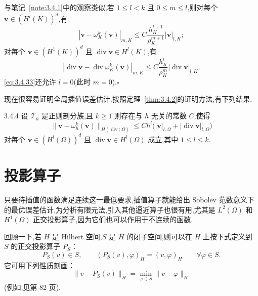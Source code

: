 \begin{note}
与笔记~\ref{note:3.4.1}中的观察类似,若 \(1\le l<k\) 且 \(0\le m\le l\),则对每个 \(\boldsymbol{v}\in(H^l(K))^d\),有
\begin{equation}\label{eq:3.4.32}
  |\boldsymbol{v}-\omega_K^k(\boldsymbol{v})|_{m,K}
   \le C\frac{h_K^{l+1}}{\rho_K^{m+1}}|\boldsymbol{v}|_{l,K};
\end{equation}
对每个 \(\boldsymbol{v}\in(H^1(K))^d\) 且 \(\operatorname{div}\boldsymbol{v}\in H^l(K)\),有
\begin{equation}\label{eq:3.4.33}
  |\operatorname{div}\boldsymbol{v}-\operatorname{div}\omega_K^k(\boldsymbol{v})|_{m,K}
   \le C\frac{h_K^l}{\rho_K^m}|\operatorname{div}\boldsymbol{v}|_{l,K}.
\end{equation}
\eqref{eq:3.4.33}还允许 \(l=0\)(此时 \(m=0\)).\hfill\(\square\)
\end{note}

现在很容易证明全局插值误差估计.按照定理~\ref{thm:3.4.2}的证明方法,有下列结果.

\begin{theorem}[]{3.4.4}
设 \(\mathcal T_h\) 是正则剖分族,且 \(k\ge1\).则存在与 \(h\) 无关的常数 \(C\),使得
\begin{equation}\label{eq:3.4.34}
  \|\boldsymbol{v}-\omega_h^k(\boldsymbol{v})\|_{H(\operatorname{div};\Omega)}
  \le Ch^l\bigl(|\boldsymbol{v}|_{l,\Omega}+|\operatorname{div}\boldsymbol{v}|_{l,\Omega}\bigr)
\end{equation}
对每个 \(\boldsymbol{v}\in(H^l(\Omega))^d\) 且 \(\operatorname{div}\boldsymbol{v}\in H^l(\Omega)\) 成立,其中 \(1\le l\le k\).
\end{theorem}

\section{投影算子}\label{sec:3.5}

只要待插值的函数满足连续这一最低要求,插值算子就能给出 Sobolev 范数意义下的最优误差估计.为分析有限元法,引入其他逼近算子也很有用,尤其是 \(L^2(\Omega)\) 和 \(H^1(\Omega)\) 正交投影算子,因为它们也可以作用于不连续的函数.

回顾一下,若 \(H\) 是 Hilbert 空间,\(S\) 是 \(H\) 的闭子空间,则可以在 \(H\) 上按下式定义到 \(S\) 的正交投影算子 \(P_S\)：
\begin{equation}\label{eq:3.5.1}
  P_S(v)\in S,\qquad (P_S(v),\varphi)_H=(v,\varphi)_H\qquad \forall\varphi\in S.
\end{equation}
它可用下列性质刻画：
\begin{equation}\label{eq:3.5.2}
  \|v-P_S(v)\|_H=\min_{\varphi\in S}\|v-\varphi\|_H
\end{equation}
(例如,见第 82 页).

